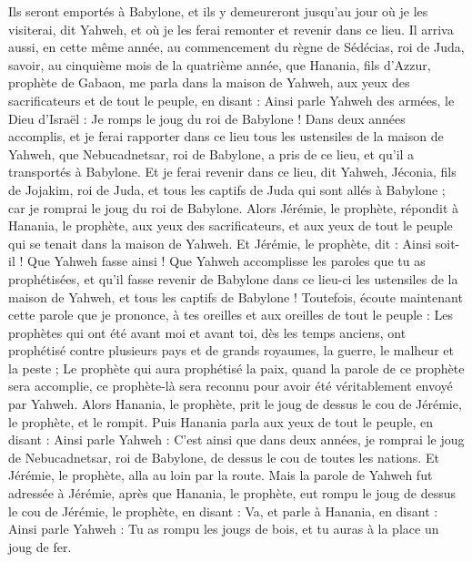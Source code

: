 \begin{multicols}{2}
Ils seront emportés à Babylone, et ils y demeureront jusqu'au jour où je les visiterai, dit Yahweh, et où je les ferai remonter et revenir dans ce lieu.
\VerseOne{}Il arriva aussi, en cette même année, au commencement du règne de Sédécias, roi de Juda, savoir, au cinquième mois de la quatrième année, que Hanania, fils d'Azzur, prophète de Gabaon, me parla dans la maison de Yahweh, aux yeux des sacrificateurs et de tout le peuple, en disant :
Ainsi parle Yahweh des armées, le Dieu d'Israël : Je romps le joug du roi de Babylone !
Dans deux années accomplis, et je ferai rapporter dans ce lieu tous les ustensiles de la maison de Yahweh, que Nebucadnetsar, roi de Babylone, a pris de ce lieu, et qu'il a transportés à Babylone.
Et je ferai revenir dans ce lieu, dit Yahweh, Jéconia, fils de Jojakim, roi de Juda, et tous les captifs de Juda qui sont allés à Babylone ; car je romprai le joug du roi de Babylone.
Alors Jérémie, le prophète, répondit à Hanania, le prophète, aux yeux des sacrificateurs, et aux yeux de tout le peuple qui se tenait dans la maison de Yahweh.
Et Jérémie, le prophète, dit : Ainsi soit-il ! Que Yahweh fasse ainsi ! Que Yahweh accomplisse les paroles que tu as prophétisées, et qu'il fasse revenir de Babylone dans ce lieu-ci les ustensiles de la maison de Yahweh, et tous les captifs de Babylone !
Toutefois, écoute maintenant cette parole que je prononce, à tes oreilles et aux oreilles de tout le peuple :
Les prophètes qui ont été avant moi et avant toi, dès les temps anciens, ont prophétisé contre plusieurs pays et de grands royaumes, la guerre, le malheur et la peste ;
Le prophète qui aura prophétisé la paix, quand la parole de ce prophète sera accomplie, ce prophète-là sera reconnu pour avoir été véritablement envoyé par Yahweh.
Alors Hanania, le prophète, prit le joug de dessus le cou de Jérémie, le prophète, et le rompit.
Puis Hanania parla aux yeux de tout le peuple, en disant : Ainsi parle Yahweh : C'est ainsi que dans deux années, je romprai le joug de Nebucadnetsar, roi de Babylone, de dessus le cou de toutes les nations. Et Jérémie, le prophète, alla au loin par la route.
Mais la parole de Yahweh fut adressée à Jérémie, après que Hanania, le prophète, eut rompu le joug de dessus le cou de Jérémie, le prophète, en disant :
Va, et parle à Hanania, en disant : Ainsi parle Yahweh : Tu as rompu les jougs de bois, et tu auras à la place un joug de fer.

\end{multicols}
